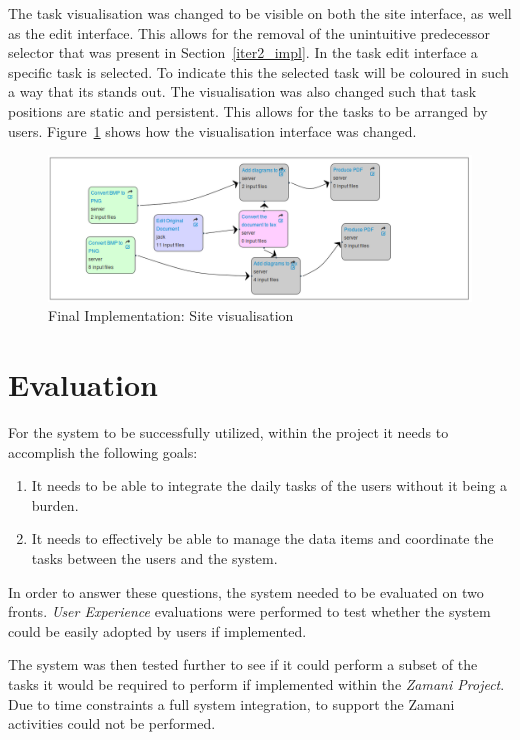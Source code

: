 \documentclass[12pt,a4paper]{report}
\begin{document}
The task visualisation was changed to be visible on both the site interface, as well as the
edit interface. This allows for the removal of the unintuitive predecessor selector that
was present in Section~\ref{iter2_impl}. In the task edit interface a
specific task is selected. To indicate this the selected task will be
coloured in such a way that its stands out. The visualisation was also
changed such that task positions are static and persistent. This allows
for the tasks to be arranged by users. Figure~\ref{final:visual} shows
how the visualisation interface was changed.


\begin{figure}[!h]
    \begin{center}
        \includegraphics[scale=0.45]{figures/final-visual.png}
    \end{center}
    \caption{Final Implementation: Site visualisation}
    \label{final:visual}
\end{figure}

\chapter{Evaluation\label{chap3}}

For the system to be successfully utilized, within the project
it needs to accomplish the following goals:
\begin{enumerate}
\item It needs to be able to integrate the daily tasks of the users
      without it being a burden.
\item It needs to effectively be able to manage the data items and
      coordinate the tasks between the users and the system.
\end{enumerate}

In order to answer these questions, the system needed to be evaluated on two
fronts. \emph{User Experience} evaluations were performed to test whether the
system could be easily adopted by users if implemented.

The system was then tested further to see if it could perform
a subset of the tasks it would be required to perform if implemented within
the \emph{Zamani Project}. Due to time constraints a full
system integration, to support the Zamani activities could not be performed.
\end{document}
